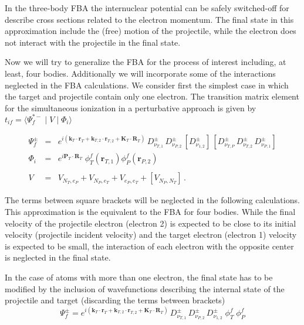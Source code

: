In the three-body FBA the internuclear potential can be safely
switched-off for describe cross sections related to the electron
momentum. The final state in this approximation include the (free)
motion of the projectile, while the electron does not interact with the
projectile in the final state.

Now we will try to generalize the FBA for the process of interest
including, at least, four bodies. Additionally we will incorporate some
of the interactions neglected in the FBA calculations. We consider
first the simplest case in which the target and projectile contain only
one electron. The transition matrix element for the simultaneous
ionization in a perturbative approach is given by $t_{if} = \langle
\Psi^{*-}_{f} \mid V\mid \Phi_{i} \rangle$

\begin{eqnarray}\label{Q:Sim1}
\Psi^{\pm}_{f} &=& e^{i (\bm{k}_{T} \cdot \bm{r}_{T} + \bm{k}_{T,2}
\cdot \bm{r}_{T,2} + \bm{K}_{T} \cdot \bm{R}_{T})} \,
D^{\pm}_{\nu_{T,1}}\, D^{\pm}_{\nu_{P,2}}\,\left[  D^{\pm}_{\nu_{1,2}}
\right] \, \left[ D^{\pm}_{\nu_{T,P}}\, D^{\pm}_{\nu_{T,2}}\,
D^{\pm}_{\nu_{P,1}} \right]
\nonumber \\
\Phi_{i} &=& e^{i \bm{P}_{T} \cdot \bm{R}_{T}} \;
\phi^{f}_{T}(\bm{r}_{T,1}) \phi^{f}_{P}(\bm{r}_{P,2})
\nonumber \\
\\
V &=&  V_{N_{T},e_{P}} + V_{N_{P},e_{T}} + V_{e_{P}, e_{T}} + \left[
V_{N_{P},N_{T}} \right] \, . \nonumber
\end{eqnarray}

The terms between square brackets will be neglected in the following
calculations. This approximation is the equivalent to the FBA for four
bodies. While the final velocity of the projectile electron (electron
2) is expected to be close to its initial velocity (projectile incident
velocity) and the target electron  (electron 1) velocity is expected to
be small, the interaction of each electron with the opposite center is
neglected in the final state.


In the case of atoms with more than one electron, the final state has
to be modified by the inclusion of wavefunctions describing the
internal state of the projectile and target (discarding the terms
between brackets)
\[
\Psi^{\pm}_{f} = e^{i (\bm{k}_{T} \cdot \bm{r}_{T} + \bm{k}_{T,2}
\cdot \bm{r}_{T,2} + \bm{K}_{T} \cdot \bm{R}_{T})} \,
D^{\pm}_{\nu_{T,1}}\, D^{\pm}_{\nu_{P,2}}\, D^{\pm}_{\nu_{1,2}} \;
\phi^{f}_{T} \; \phi^{f}_{P}
\]


